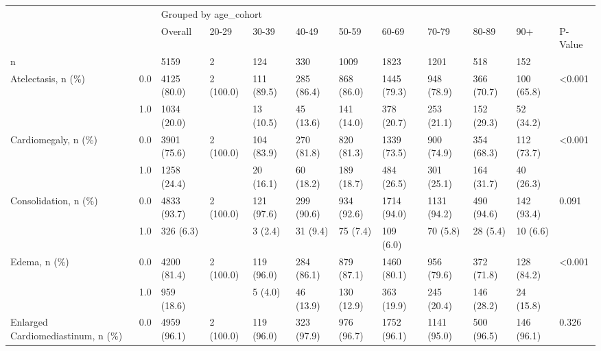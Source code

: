 \begin{tabular}{llllllllllll}
\toprule
                       &     & \multicolumn{10}{l}{Grouped by age\_cohort} \\
                       &     &               Overall &      20-29 &        30-39 &       40-49 &       50-59 &        60-69 &        70-79 &       80-89 &          90+ & P-Value \\
\midrule
n & {} &                  5159 &          2 &          124 &         330 &        1009 &         1823 &         1201 &         518 &          152 &         \\
Atelectasis, n (\%) & 0.0 &           4125 (80.0) &  2 (100.0) &   111 (89.5) &  285 (86.4) &  868 (86.0) &  1445 (79.3) &   948 (78.9) &  366 (70.7) &   100 (65.8) &  <0.001 \\
                       & 1.0 &           1034 (20.0) &            &    13 (10.5) &   45 (13.6) &  141 (14.0) &   378 (20.7) &   253 (21.1) &  152 (29.3) &    52 (34.2) &         \\
Cardiomegaly, n (\%) & 0.0 &           3901 (75.6) &  2 (100.0) &   104 (83.9) &  270 (81.8) &  820 (81.3) &  1339 (73.5) &   900 (74.9) &  354 (68.3) &   112 (73.7) &  <0.001 \\
                       & 1.0 &           1258 (24.4) &            &    20 (16.1) &   60 (18.2) &  189 (18.7) &   484 (26.5) &   301 (25.1) &  164 (31.7) &    40 (26.3) &         \\
Consolidation, n (\%) & 0.0 &           4833 (93.7) &  2 (100.0) &   121 (97.6) &  299 (90.6) &  934 (92.6) &  1714 (94.0) &  1131 (94.2) &  490 (94.6) &   142 (93.4) &   0.091 \\
                       & 1.0 &             326 (6.3) &            &      3 (2.4) &    31 (9.4) &    75 (7.4) &    109 (6.0) &     70 (5.8) &    28 (5.4) &     10 (6.6) &         \\
Edema, n (\%) & 0.0 &           4200 (81.4) &  2 (100.0) &   119 (96.0) &  284 (86.1) &  879 (87.1) &  1460 (80.1) &   956 (79.6) &  372 (71.8) &   128 (84.2) &  <0.001 \\
                       & 1.0 &            959 (18.6) &            &      5 (4.0) &   46 (13.9) &  130 (12.9) &   363 (19.9) &   245 (20.4) &  146 (28.2) &    24 (15.8) &         \\
Enlarged Cardiomediastinum, n (\%) & 0.0 &           4959 (96.1) &  2 (100.0) &   119 (96.0) &  323 (97.9) &  976 (96.7) &  1752 (96.1) &  1141 (95.0) &  500 (96.5) &   146 (96.1) &   0.326 \\

\end{tabular}
